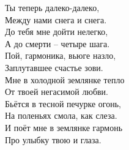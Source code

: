 \documentclass[fleqn,a5paper,12pt,twoside]{guitartabs}
\begin{document}
    \-\hspace{3mm}Ты теперь далеко-далеко,\\
    \-\hspace{3mm}Между нами снега и снега.\\
    \-\hspace{3mm}До тебя мне дойти нелегко,\\
    \-\hspace{3mm}А до смерти -- четыре шага.\\
    \-\hspace{3mm}Пой, гармоника, вьюге назло,\\
    \-\hspace{3mm}Заплутавшее счастье зови.\\
    \-\hspace{3mm}Мне в холодной землянке тепло\\
    \-\hspace{3mm}От твоей негасимой любви.\\
    
    Бьётся в тесной печурке огонь,\\
    На поленьях смола, как слеза.\\
    И поёт мне в землянке гармонь\\
    Про улыбку твою и глаза.
\newpage
{}%
\end{document}
